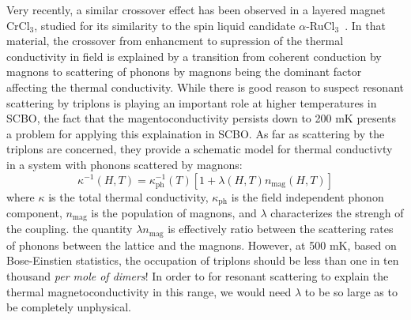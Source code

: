 \documentclass{thesis-umich}
\begin{document}
Very recently, a similar crossover effect has been observed in a layered magnet CrCl$_3$, studied for its similarity to the spin liquid candidate $\alpha$-RuCl$_3$~\cite{Pocs2019}. In that material, the crossover from enhancment to supression of the thermal conductivity in field is explained by a transition from coherent conduction by magnons to scattering of phonons by magnons being the dominant factor affecting the thermal conductivity. While there is good reason to suspect resonant scattering by triplons is playing an important role at higher temperatures in SCBO, the fact that the magentoconductivity persists down to 200 mK presents a problem for applying this explaination in SCBO. As far as scattering by the triplons are concerned, they provide a schematic model for thermal conductivty in a system with phonons scattered by magnons:
\[\kappa^{-1}(H,T) = \kappa^{-1}_{\mathrm{ph}}(T)[1 + \lambda(H,T)n_{\mathrm{mag}}(H,T)]\]
where $\kappa$ is the total thermal conductivity, $\kappa_{\mathrm{ph}}$ is the field independent phonon component, $n_{\mathrm{mag}}$ is the population of magnons, and $\lambda$ characterizes the strengh of the coupling. the quantity $\lambda n_{\mathrm{mag}}$ is effectively ratio between the scattering rates of phonons between the lattice and the magnons. However, at 500 mK, based on Bose-Einstien statistics, the occupation of triplons should be less than one in ten thousand \textit{per mole of dimers}! In order to for resonant scattering to explain the thermal magnetoconductivity in this range, we would need $\lambda$ to be so large as to be completely unphysical. 
\end{document}
